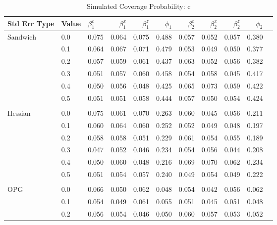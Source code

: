 \documentclass[12pt]{article}
\theoremstyle{definition}
\begin{document}
\begin{table}[b!] \centering
  \caption{Simulated Coverage Probability: c}
  \begin{threeparttable}
    {\footnotesize
    \begin{tabular}[r]{l l l r r r r r r r r}
  \hline
Std Err Type & Value & $\beta_{1}^{c}$ & $\beta_{1}^{x}$ & $\beta_{1}^{z}$ & $\phi_{1}$ & $\beta_{2}^{c}$ & $\beta_{2}^{x}$ & $\beta_{2}^{z}$ & $\phi_{2}$ \\ 
  \hline

Sandwich  & 0.0 & 0.075 & 0.064 & 0.075 & 0.488 & 0.057 & 0.052 & 0.057 & 0.380 \\
          & 0.1 & 0.064 & 0.067 & 0.071 & 0.479 & 0.053 & 0.049 & 0.050 & 0.377 \\
          & 0.2 & 0.057 & 0.059 & 0.061 & 0.437 & 0.063 & 0.052 & 0.056 & 0.382 \\
          & 0.3 & 0.051 & 0.057 & 0.060 & 0.458 & 0.054 & 0.058 & 0.045 & 0.417 \\
          & 0.4 & 0.050 & 0.056 & 0.048 & 0.425 & 0.065 & 0.073 & 0.059 & 0.422 \\
          & 0.5 & 0.051 & 0.051 & 0.058 & 0.444 & 0.057 & 0.050 & 0.054 & 0.424 \\
          &     &       &       &       &       &       &       &       &       \\
Hessian   & 0.0 & 0.075 & 0.061 & 0.070 & 0.263 & 0.060 & 0.045 & 0.056 & 0.211 \\
          & 0.1 & 0.060 & 0.064 & 0.060 & 0.252 & 0.052 & 0.049 & 0.048 & 0.197 \\
          & 0.2 & 0.058 & 0.058 & 0.051 & 0.229 & 0.061 & 0.054 & 0.055 & 0.189 \\
          & 0.3 & 0.047 & 0.052 & 0.046 & 0.234 & 0.054 & 0.056 & 0.044 & 0.208 \\
          & 0.4 & 0.050 & 0.060 & 0.048 & 0.216 & 0.069 & 0.070 & 0.062 & 0.234 \\
          & 0.5 & 0.051 & 0.054 & 0.057 & 0.240 & 0.049 & 0.054 & 0.049 & 0.222 \\
          &     &       &       &       &       &       &       &       &       \\
OPG       & 0.0 & 0.066 & 0.050 & 0.062 & 0.048 & 0.054 & 0.042 & 0.056 & 0.062 \\
          & 0.1 & 0.054 & 0.049 & 0.061 & 0.055 & 0.051 & 0.045 & 0.051 & 0.048 \\
          & 0.2 & 0.056 & 0.054 & 0.046 & 0.050 & 0.060 & 0.057 & 0.053 & 0.052 \\

\end{tabular}}
\end{threeparttable}
\end{table}
\end{document}
